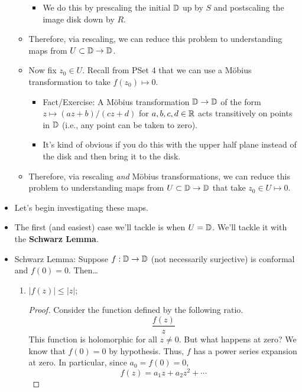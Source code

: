 \documentclass[../notes.tex]{subfiles}
\begin{document}
\begin{itemize}
\begin{itemize}
        \begin{itemize}
            \item We do this by prescaling the initial $\mathbb{D}$ up by $S$ and postscaling the image disk down by $R$.
        \end{itemize}
        \item Therefore, via rescaling, we can reduce this problem to understanding maps from $U\subset\mathbb{D}\to\mathbb{D}$.
        \item Now fix $z_0\in U$. Recall from PSet 4 that we can use a M\"{o}bius transformation to take $f(z_0)\mapsto 0$.
        \begin{itemize}
            \item Fact/Exercise: A M\"{o}bius transformation $\mathbb{D}\to\mathbb{D}$ of the form $z\mapsto(az+b)/(cz+d)$ for $a,b,c,d\in\mathbb{R}$ acts transitively on points in $\mathbb{D}$ (i.e., any point can be taken to zero).
            \item It's kind of obvious if you do this with the upper half plane instead of the disk and then bring it to the disk.
        \end{itemize}
        \item Therefore, via rescaling \emph{and} M\"{o}bius transformations, we can reduce this problem to understanding maps from $U\subset\mathbb{D}\to\mathbb{D}$ that take $z_0\in U\mapsto 0$.
    \end{itemize}
    \item Let's begin investigating these maps.
    \item The first (and easiest) case we'll tackle is when $U=\mathbb{D}$. We'll tackle it with the \textbf{Schwarz Lemma}.
    \item Schwarz Lemma: Suppose $f:\mathbb{D}\to\mathbb{D}$ (not necessarily surjective) is conformal and $f(0)=0$. Then\dots
    \begin{enumerate}
        \item $|f(z)|\leq|z|$;
        \begin{proof}
            Consider the function defined by the following ratio.
            \begin{equation*}
                \frac{f(z)}{z}
            \end{equation*}
            This function is holomorphic for all $z\neq 0$. But what happens at zero? We know that $f(0)=0$ by hypothesis. Thus, $f$ has a power series expansion at zero. In particular, since $a_0=f(0)=0$,
            \begin{equation*}
                f(z) = a_1z+a_2z^2+\cdots
            \end{equation*}

\end{proof}
\end{enumerate}
\end{itemize}
\end{document}
